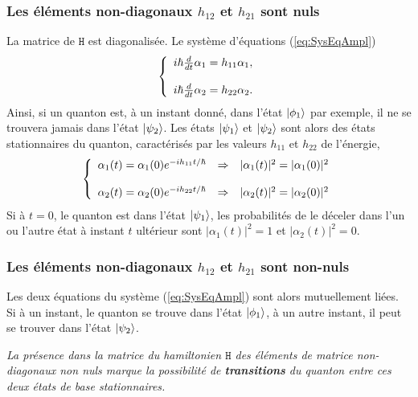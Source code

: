 \subsubsection{Les éléments non-diagonaux $h_{12}$ et $h_{21}$ sont nuls}

La matrice de $\mathtt{H}$ est diagonalisée. Le système d'équations
(\ref{eq:SysEqAmpl})%
\begin{equation}
\left\{
\begin{array}
[c]{c}%
i\hbar\frac{d}{dt}\alpha_1=h_{11}\alpha_1,\\
\\
i\hbar\frac{d}{dt}\alpha_2=h_{22}\alpha_2.
\end{array}
\right.
\end{equation}
Ainsi, si un quanton est, à un instant donné, dans l'état $\vert\phi_1\rangle$ par
exemple, il ne se trouvera jamais dans l'état $\vert\psi_2\rangle$. Les états
$\vert\psi_1\rangle $ et $\vert\psi_2\rangle$ sont alors des états stationnaires du
quanton, caractérisés par les valeurs $h_{11}$ et $h_{22}$ de l'énergie,%
\begin{equation}
\left\{
\begin{array}
[c]{ccc}%
\alpha_1(t)=\alpha_1(0)e^{-ih_{11}t/\hbar} & \Rightarrow &
|\alpha_1(t)|^{2}=|\alpha_1(0)|^{2}\\
&  & \\
\alpha_2(t)=\alpha_2(0)e^{-ih_{22}t/\hbar} & \Rightarrow &
|\alpha_2(t)|^{2}=|\alpha_2(0)|^{2}%
\end{array}
\right.
\end{equation}
Si à $t=0$, le quanton est dans l'état $\vert\psi_1\rangle $,
les probabilités de le déceler dans l'un ou l'autre état à instant $t$
ultérieur sont $|\alpha_1(t)|^{2}=1$ et $|\alpha_2(t)|^{2}=0$.

\subsubsection{Les éléments non-diagonaux $h_{12}$ et $h_{21}$ sont non-nuls}

Les deux équations du système (\ref{eq:SysEqAmpl}) sont alors mutuellement
liées. Si à un instant, le quanton se trouve dans l'état $\vert\phi_1\rangle$, à un
autre instant, il peut se trouver dans l'état $\vert\psi_2\rangle$.

\medskip
\colorbox[gray]{0.8}{
\parbox[c]{0.9\textwidth}{
\emph{La présence dans la matrice du hamiltonien $\mathtt{H}$ des éléments de
matrice
non-diagonaux non nuls marque la possibilité de \textbf{transitions} du quanton
entre ces deux états de base stationnaires.}
}}


